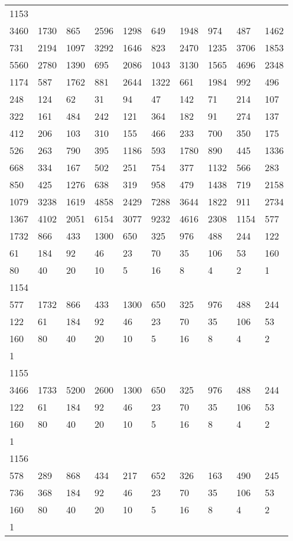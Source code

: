 \begin{longtable}{*{10}{l}}
1153&&&&&&&&&\\
3460& 1730& 865& 2596& 1298& 649& 1948& 974& 487& 1462\\
731& 2194& 1097& 3292& 1646& 823& 2470& 1235& 3706& 1853\\
5560& 2780& 1390& 695& 2086& 1043& 3130& 1565& 4696& 2348\\
1174& 587& 1762& 881& 2644& 1322& 661& 1984& 992& 496\\
248& 124& 62& 31& 94& 47& 142& 71& 214& 107\\
322& 161& 484& 242& 121& 364& 182& 91& 274& 137\\
412& 206& 103& 310& 155& 466& 233& 700& 350& 175\\
526& 263& 790& 395& 1186& 593& 1780& 890& 445& 1336\\
668& 334& 167& 502& 251& 754& 377& 1132& 566& 283\\
850& 425& 1276& 638& 319& 958& 479& 1438& 719& 2158\\
1079& 3238& 1619& 4858& 2429& 7288& 3644& 1822& 911& 2734\\
1367& 4102& 2051& 6154& 3077& 9232& 4616& 2308& 1154& 577\\
1732& 866& 433& 1300& 650& 325& 976& 488& 244& 122\\
61& 184& 92& 46& 23& 70& 35& 106& 53& 160\\
80& 40& 20& 10& 5& 16& 8& 4& 2& 1\\

1154&&&&&&&&&\\
577& 1732& 866& 433& 1300& 650& 325& 976& 488& 244\\
122& 61& 184& 92& 46& 23& 70& 35& 106& 53\\
160& 80& 40& 20& 10& 5& 16& 8& 4& 2\\
1& \\

1155&&&&&&&&&\\
3466& 1733& 5200& 2600& 1300& 650& 325& 976& 488& 244\\
122& 61& 184& 92& 46& 23& 70& 35& 106& 53\\
160& 80& 40& 20& 10& 5& 16& 8& 4& 2\\
1& \\

1156&&&&&&&&&\\
578& 289& 868& 434& 217& 652& 326& 163& 490& 245\\
736& 368& 184& 92& 46& 23& 70& 35& 106& 53\\
160& 80& 40& 20& 10& 5& 16& 8& 4& 2\\
1& \\


\end{longtable}
